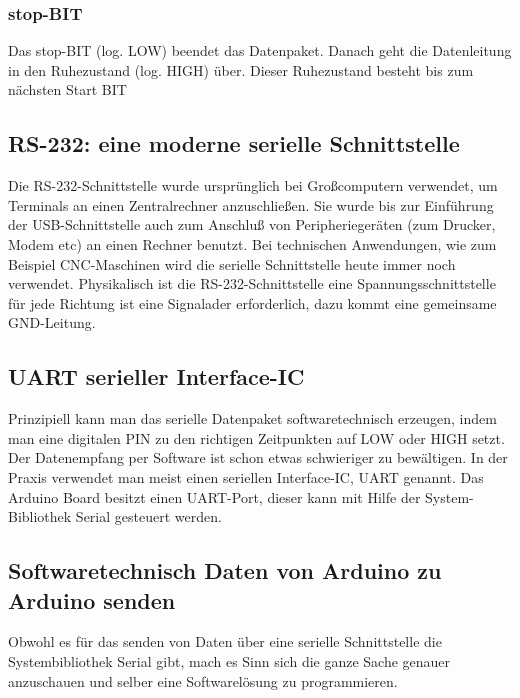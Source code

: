 \subsubsection{stop-BIT}

Das stop-BIT (log. LOW) beendet das Datenpaket. Danach geht die Datenleitung in den Ruhezustand (log. HIGH) über. Dieser Ruhezustand besteht bis zum nächsten Start BIT   


\subsection{RS-232: eine moderne serielle Schnittstelle}
Die RS-232-Schnittstelle wurde ursprünglich bei Großcomputern verwendet, um Terminals an einen Zentralrechner anzuschließen. 
Sie wurde bis zur Einführung der USB-Schnittstelle auch zum Anschluß von Peripheriegeräten (zum Drucker, Modem etc) an einen Rechner benutzt. Bei technischen Anwendungen, wie zum Beispiel CNC-Maschinen wird die serielle Schnittstelle heute immer noch verwendet. Physikalisch ist die RS-232-Schnittstelle eine Spannungsschnittstelle für jede Richtung ist eine Signalader erforderlich, dazu kommt eine gemeinsame GND-Leitung.  


\subsection{UART serieller Interface-IC}
Prinzipiell kann man das serielle Datenpaket softwaretechnisch erzeugen, indem man eine digitalen PIN  zu den richtigen Zeitpunkten auf LOW oder HIGH setzt. Der Datenempfang per Software ist schon etwas schwieriger zu bewältigen. In der Praxis verwendet man meist einen seriellen Interface-IC, UART   genannt. Das Arduino Board besitzt einen UART-Port, dieser kann mit Hilfe der System-Bibliothek Serial gesteuert werden. 

\subsection{Softwaretechnisch Daten von Arduino zu Arduino senden}
Obwohl es für das senden von Daten über eine serielle Schnittstelle die Systembibliothek Serial gibt, mach es Sinn sich die ganze Sache genauer anzuschauen und selber eine Softwarelösung zu programmieren.
 

